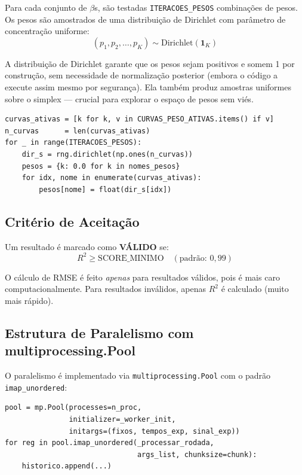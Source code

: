 \documentclass[12pt,a4paper]{report}
\newcommand{\code}[1]{\texttt{#1}}
\begin{document}
Para cada conjunto de $\beta$s, são testadas \code{ITERACOES\_PESOS}
combinações de pesos. Os pesos são amostrados de uma distribuição de
Dirichlet com parâmetro de concentração uniforme:
\[
  (p_1, p_2, \ldots, p_K) \sim \text{Dirichlet}(\mathbf{1}_K)
\]

A distribuição de Dirichlet garante que os pesos sejam positivos e somem 1
por construção, sem necessidade de normalização posterior (embora o código
a execute assim mesmo por segurança). Ela também produz amostras uniformes
sobre o simplex — crucial para explorar o espaço de pesos sem viés.

\begin{lstlisting}[caption={Amostragem de pesos via Dirichlet}]
curvas_ativas = [k for k, v in CURVAS_PESO_ATIVAS.items() if v]
n_curvas      = len(curvas_ativas)
for _ in range(ITERACOES_PESOS):
    dir_s = rng.dirichlet(np.ones(n_curvas))
    pesos = {k: 0.0 for k in nomes_pesos}
    for idx, nome in enumerate(curvas_ativas):
        pesos[nome] = float(dir_s[idx])
\end{lstlisting}

\subsection{Critério de Aceitação}

Um resultado é marcado como \textbf{VÁLIDO} se:
\[
  R^2 \geq \text{SCORE\_MINIMO} \quad (\text{padrão: } 0{,}99)
\]

O cálculo de RMSE é feito \emph{apenas} para resultados válidos, pois é
mais caro computacionalmente. Para resultados inválidos, apenas $R^2$
é calculado (muito mais rápido).

\subsection{Estrutura de Paralelismo com multiprocessing.Pool}

O paralelismo é implementado via \code{multiprocessing.Pool} com o
padrão \texttt{imap\_unordered}:

\begin{lstlisting}[caption={Pool multiprocessing com imap\_unordered}]
pool = mp.Pool(processes=n_proc,
               initializer=_worker_init,
               initargs=(fixos, tempos_exp, sinal_exp))
for reg in pool.imap_unordered(_processar_rodada,
                               args_list, chunksize=chunk):
    historico.append(...)
\end{lstlisting}
\end{document}
